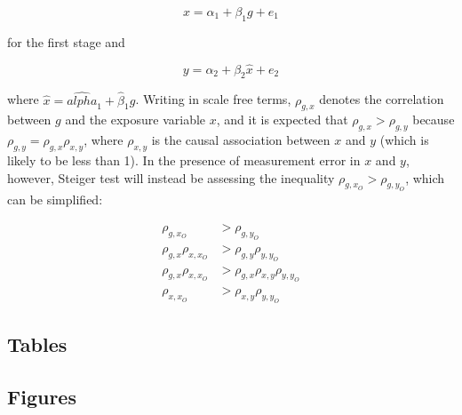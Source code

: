 \documentclass[]{article}
\begin{document}
\[
x = \alpha_1 + \beta_1 g + e_1
\]

for the first stage and

\[
y = \alpha_2 + \beta_2 \hat{x} + e_2
\]

where \(\hat{x} = \hat{alpha}_1 + \hat{\beta}_1 g\). Writing in scale
free terms, \(\rho_{g, x}\) denotes the correlation between \(g\) and
the exposure variable \(x\), and it is expected that
\(\rho_{g, x} > \rho_{g, y}\) because
\(\rho_{g, y} = \rho_{g, x}\rho_{x, y}\), where \(\rho_{x, y}\) is the
causal association between \(x\) and \(y\) (which is likely to be less
than 1). In the presence of measurement error in \(x\) and \(y\),
however, Steiger test will instead be assessing the inequality
\(\rho_{g, x_O} > \rho_{g, y_O}\), which can be simplified:

\[
\begin{aligned}
\rho_{g, x_O} & > \rho_{g, y_O} \\
\rho_{g, x} \rho_{x, x_O} & > \rho_{g,y}\rho_{y,y_O}\\
\rho_{g, x} \rho_{x, x_O} & > \rho_{g,x}\rho_{x,y}\rho_{y,y_O}\\
\rho_{x, x_O} & > \rho_{x,y}\rho_{y,y_O}
\end{aligned}
\]

\newpage

\subsection{Tables}\label{tables}

\newpage

\subsection{Figures}\label{figures}
\end{document}
